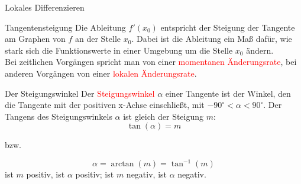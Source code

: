 \begin{section}{Lokales Differenzieren}
\begin{bem*}{Tangentensteigung}{}
   Die Ableitung $f'(x_0)$ entspricht der Steigung der Tangente am Graphen von $f$ an der Stelle $x_0$. Dabei ist die Ableitung ein Maß dafür, wie stark sich die Funktionswerte in einer Umgebung um die Stelle $x_0$ ändern. \\
   Bei zeitlichen  Vorgängen spricht man von einer \textcolor{red}{momentanen Änderungsrate}, bei anderen Vorgängen von einer \textcolor{red}{lokalen Änderungsrate}.
\end{bem*}
\begin{bem*}{Der Steigungswinkel}{}
Der \textcolor{red}{Steigungswinkel} $\alpha$ einer Tangente ist der Winkel, den die Tangente mit der positiven x-Achse einschließt, mit $-90^{\circ}<\alpha<90^{\circ}$. Der Tangens des Steigungswinkels $\alpha$ ist gleich der Steigung $m$:$$\tan{(\alpha)} = m$$ \begin{center}
    bzw.
\end{center} $$\alpha = \arctan{(m)} = \tan^{-1}{(m)}$$
ist $m$ positiv, ist $\alpha$ positiv; ist $m$ negativ, ist $\alpha$ negativ. 
\begin{center}
\end{center}
\end{bem*}
\end{section}
